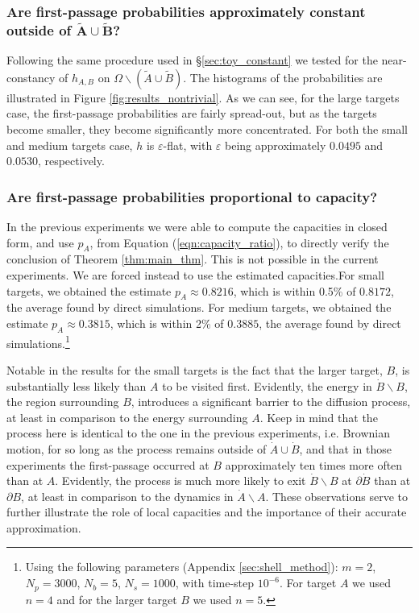 \documentclass[12pt, nofootinbib,english, amsmath, amssymb, aps, priprint, graphicx,floatfix]{revtex4-1}
\theoremstyle{plain}
\theoremstyle{definition}
\theoremstyle{plain}
\newcommand{\dA}{{\dot A}}
\newcommand{\tA}{{\tilde A}}
\newcommand{\dB}{{\dot B}}
\newcommand{\tB}{{\tilde B}}
\begin{document}
\subsubsection{Are first-passage probabilities approximately constant outside of $\bm{\tA\cup\tB}$?}
Following the same procedure used in \S\ref{sec:toy_constant} we tested for the near-constancy of $h_{A,B}$ on $\Omega\backslash(\tA\cup\tB)$. The histograms of the probabilities are illustrated in Figure \ref{fig:results_nontrivial}. As we can see, for the large targets case, the first-passage probabilities are fairly spread-out, but as the targets become smaller, they become significantly more concentrated. For both the small and medium targets case, $h$ is $\varepsilon$-flat, with $\varepsilon$ being approximately $0.0495$ and $0.0530$, respectively.

\subsubsection{Are first-passage probabilities proportional to capacity?}
In the previous experiments we were able to compute the capacities in closed form, and use $p_A$, from Equation (\ref{eqn:capacity_ratio}), to directly verify the conclusion of Theorem \ref{thm:main_thm}. This is not possible in the current experiments. We are forced instead to use the estimated capacities.For small targets, we obtained the estimate $p_A\approx 0.8216$, which is within 0.5\% of $0.8172$, the average found by direct simulations. For medium targets, we obtained the estimate $p_A\approx 0.3815$, which is within 2\% of $0.3885$, the average found by direct simulations.\footnote{Using the following parameters (Appendix \ref{sec:shell_method}): $m = 2$, $N_p = 3000$, $N_b = 5$, $N_s = 1000$, with time-step $10^{-6}$.  For target $A$ we used $n = 4$ and for the larger target $B$ we used $n = 5$.} 

Notable in the results for the small targets is the fact that the larger target, $B$, is substantially less likely than $A$ to be visited first. Evidently, the energy in $\dB\backslash B$, the region surrounding $B$, introduces a significant barrier to the diffusion process, at least in comparison to the energy surrounding $A$. Keep in mind that the process here is identical to the one in the previous experiments, i.e. Brownian motion, for so long as the process remains outside of 
$\dA\cup\dB$, and that in those experiments the first-passage occurred at $B$ approximately ten times more often than at $A$.
Evidently, the process is much more likely to exit $\dB\backslash B$ at $\partial\dB$ than at $\partial B$, at least in comparison to the dynamics in $\dA\backslash A$. These observations serve to further illustrate the role of local capacities and the importance of  their accurate approximation.
\end{document}
